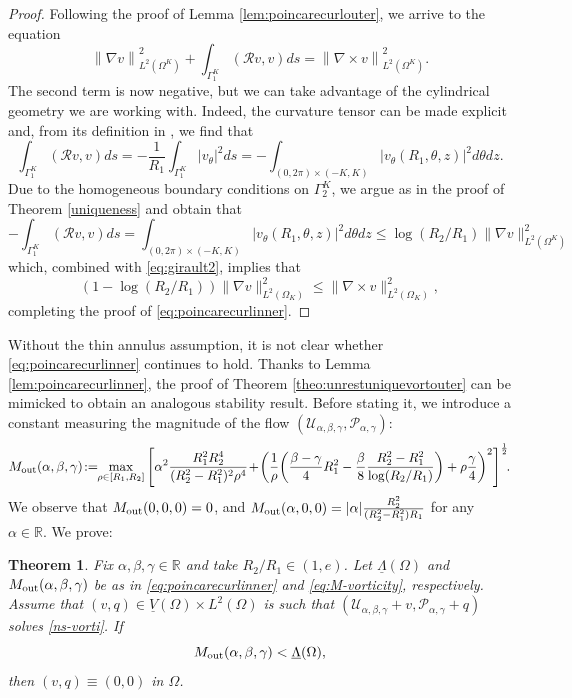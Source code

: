 \documentclass[a4paper,11pt]{amsart}
\newtheorem{theorem}{Theorem}[section]
\numberwithin{equation}{section}
\numberwithin{figure}{section}
\def\U{{\mathcal U}}
\def\P{{\mathcal P}}
\newcommand{\norm}[1]{\left \lVert #1 \right \rVert}
\begin{document}
    \begin{proof}
    Following the proof of Lemma \ref{lem:poincarecurlouter}, we arrive to the equation
\begin{equation}\label{eq:girault2}
	\norm{\nabla v}^2_{L^2(\Omega^K)}+\int_{\Gamma^K_1} (\mathcal{R}v,v)ds=\norm{\nabla\times v}^2_{L^2(\Omega^K)}.
\end{equation}
The second term is now negative, but we can take advantage of the cylindrical geometry we are working with. Indeed, the curvature tensor can be made explicit and, from its definition in \cite[Section 3.1.1.1]{grisvard1985elliptic}, we find that $$\int_{\Gamma_1^K}(\mathcal{R}v,v)ds= -\frac{1}{R_1}\int_{\Gamma_1^K}|v_\theta|^2 ds= -\int_{(0,2\pi)\times (-K,K)}|v_\theta(R_1, \theta, z)|^2 d\theta dz. $$ Due to the homogeneous boundary conditions on $\Gamma_2^K$, we argue as in the proof of Theorem \ref{uniqueness} and obtain that
	\begin{equation*}
-\int_{\Gamma_1^K}(\mathcal{R}v,v)ds=\int_{(0,2\pi)\times (-K,K)}|v_\theta(R_1, \theta, z)|^2 d\theta dz\leq \log\left(R_2/R_1\right)\|\nabla v\|^2_{L^2(\Omega^K)}
	\end{equation*}which, combined with  \eqref{eq:girault2}, implies that $$\left(1-\log\left(R_2/R_1\right)\right)\|\nabla v\|^2_{L^2(\Omega_K)}\leq \|\nabla \times v\|^2_{L^2(\Omega_K)},$$
    completing the proof of \eqref{eq:poincarecurlinner}.\end{proof}

    Without the thin annulus assumption, it is not clear whether   \eqref{eq:poincarecurlinner} continues to hold.
	Thanks to Lemma \ref{lem:poincarecurlinner}, the proof of Theorem \ref{theo:unrestuniquevortouter} can be mimicked to obtain an analogous stability result.
	Before stating it, we introduce a constant measuring the magnitude of the flow $(\U_{\alpha,\beta,\gamma},\P_{\alpha,\gamma})$:
	\begin{equation}\label{eq:M-vorticity}
		{M}_{\rm out}(\alpha,\beta,\gamma)\!:= \! \!\max_{\rho\in [R_1,R_2]}\left[\alpha^2 \frac{R_1^2R_2^4}{(R_2^2 -R_1^2)^2\rho^4} \!+\!\left(\frac{1}{\rho}
		\bigg(\frac{\beta-\gamma}{4}R_1^2
		-\frac{\beta}{8}\frac{R_2^2-R_1^2}{\log(R_2/R_1)}\bigg)
		+\rho\frac{\gamma}{4} \right)^2\right]^{\frac{1}{2}}\!\!.
	\end{equation}
	We observe that ${M}_{\rm out}(0,0,0)=0$, and ${M}_{\rm out}(\alpha,0,0)=|\alpha|\frac{R^2_2}{(R_2^2-R_1^2)R_1}$ for any $\alpha\in\mathbb{R}$. We prove:
	 \begin{theorem}\label{theo-uni-inner}
		Fix $\alpha,\beta,\gamma\in\mathbb{R}$ and take ${R_2}/{R_1}\in (1,e)$. Let $\underline{{\Lambda}}(\Omega)$ and ${M}_{\rm out}(\alpha,\beta,\gamma)$ be as in \eqref{eq:poincarecurlinner} and \eqref{eq:M-vorticity}, respectively. Assume that $(v,q)\in \underline{ V}(\Omega)\times L^2(\Omega)$ is such that $(\U_{\alpha,\beta,\gamma}+v,\P_{\alpha,\gamma}+q)$ solves \eqref{ns-vorti}. If
		\begin{equation}\label{uniqueness-cond-vort-outer2}
			{M}_{\rm out}(\alpha,\beta,\gamma)<\underline{{\Lambda}}(\Omega),
		\end{equation}
		then $(v,q)\equiv (0,0)$ in $\Omega$.
	\end{theorem}
\end{document}
